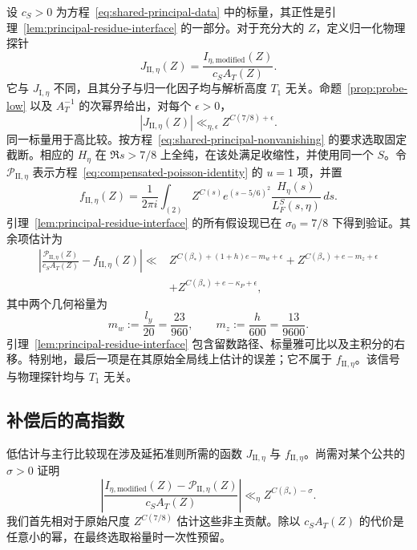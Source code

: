 \documentclass[11pt,a4paper]{article}
\numberwithin{equation}{section}
\numberwithin{figure}{section}
\theoremstyle{definition}
\theoremstyle{remark}
\begin{document}
设 \(c_S>0\) 为方程~\eqref{eq:shared-principal-data} 中的标量，其正性是引理~\ref{lem:principal-residue-interface} 的一部分。对于充分大的 \(Z\)，定义归一化物理探针
\[
 J_{\mathrm{II},\eta}(Z)
   =\frac{I_{\eta,\mathrm{modified}}(Z)}{c_S A_T(Z)}.
\]
它与 \(J_{\mathrm I,\eta}\) 不同，且其分子与归一化因子均与解析高度 \(T_1\) 无关。命题~\ref{prop:probe-low} 以及 \(A_T^{-1}\) 的次幂界给出，对每个 \(\epsilon>0\)，
\begin{equation}\label{eq:part-II-normalized-low}
 |J_{\mathrm{II},\eta}(Z)|
 \ll_{\eta,\epsilon} Z^{C(7/8)+\epsilon}.
\end{equation}
同一标量用于高比较。按方程~\eqref{eq:shared-principal-nonvanishing} 的要求选取固定截断。相应的
\(H_\eta\) 在 \(\Re s>7/8\) 上全纯，在该处满足收缩性，并使用同一个 \(S\)。令 \(\mathscr P_{\mathrm{II},\eta}\)
表示方程~\eqref{eq:compensated-poisson-identity} 的 \(u=1\) 项，并置
\[
 f_{\mathrm{II},\eta}(Z)=\frac1{2\pi i}\int_{(2)}
 Z^{C(s)}e^{(s-5/6)^2}\frac{H_\eta(s)}{L_F^S(s,\eta)}\,ds.
\]
引理~\ref{lem:principal-residue-interface} 的所有假设现已在 \(\sigma_0=7/8\) 下得到验证。其余项估计为
\[
 \begin{split}
 \left|\frac{\mathscr P_{\mathrm{II},\eta}(Z)}{c_S A_T(Z)}
       -f_{\mathrm{II},\eta}(Z)\right|
 \ll{}&
 Z^{C(\beta_*)+(1+h)e-m_w+\epsilon}
 +Z^{C(\beta_*)+e-m_z+\epsilon}\\
 &+Z^{C(\beta_*)+e-\kappa_P+\epsilon},
 \end{split}
\]
其中两个几何裕量为
\begin{equation}\label{old-eq:5.14}
 m_w:=\frac{l_y}{20}=\frac{23}{960},\qquad
 m_z:=\frac h{600}=\frac{13}{9600}.
\end{equation}
引理~\ref{lem:principal-residue-interface} 包含留数路径、标量雅可比以及主积分的右移。特别地，最后一项是在其原始全局线上估计的误差；它不属于
\(f_{\mathrm{II},\eta}\)。该信号与物理探针均与 \(T_1\) 无关。

\subsection{补偿后的高指数}

低估计与主行比较现在涉及延拓准则所需的函数
$J_{\mathrm{II},\eta}$ 与 $f_{\mathrm{II},\eta}$。尚需对某个公共的 $\sigma>0$ 证明
\[
 \left|\frac{I_{\eta,\mathrm{modified}}(Z)
                -\mathscr P_{\mathrm{II},\eta}(Z)}{c_S A_T(Z)}\right|
 \ll_\eta Z^{C(\beta_*)-\sigma}.
\]
我们首先相对于原始尺度 $Z^{C(7/8)}$ 估计这些非主贡献。除以 $c_S A_T(Z)$ 的代价是任意小的幂，在最终选取裕量时一次性预留。
\end{document}
